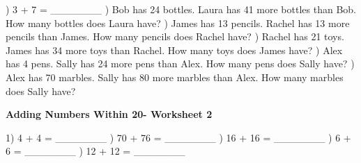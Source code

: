 \documentclass{article}%
\begin{document}
) 3 + 7 = \_\_\_\_\_\_\_%
\newline%
\newline%
) Bob has 24 bottles. Laura has 41 more bottles than Bob. How many bottles does Laura have?%
\newline%
\newline%
) James has 13 pencils. Rachel has 13 more pencils than James. How many pencils does Rachel have?%
\newline%
\newline%
) Rachel has 21 toys. James has 34 more toys than Rachel. How many toys does James have?%
\newline%
\newline%
) Alex has 4 pens. Sally has 24 more pens than Alex. How many pens does Sally have?%
\newline%
\newline%
) Alex has 70 marbles. Sally has 80 more marbles than Alex. How many marbles does Sally have?%
\newline%
\newline%
\newline%
\pagebreak%
\large%
\begin{center}%
\textbf{Adding Numbers Within 20- Worksheet 2}%
\newline%
\newline%
\newline%
\end{center} \normalsize%
1) 4 + 4 = \_\_\_\_\_\_\_%
\newline%
\newline%
) 70 + 76 = \_\_\_\_\_\_\_%
\newline%
\newline%
) 16 + 16 = \_\_\_\_\_\_\_%
\newline%
\newline%
) 6 + 6 = \_\_\_\_\_\_\_%
\newline%
\newline%
) 12 + 12 = \_\_\_\_\_\_\_%
\newline%
\newline%
\end{document}
